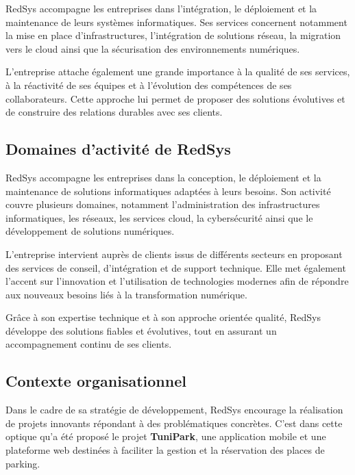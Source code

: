 \par RedSys accompagne les entreprises dans l'intégration, le déploiement et la maintenance de leurs systèmes informatiques. Ses services concernent notamment la mise en place d'infrastructures, l'intégration de solutions réseau, la migration vers le cloud ainsi que la sécurisation des environnements numériques.

\par L'entreprise attache également une grande importance à la qualité de ses services, à la réactivité de ses équipes et à l'évolution des compétences de ses collaborateurs. Cette approche lui permet de proposer des solutions évolutives et de construire des relations durables avec ses clients.


\subsection{Domaines d'activité de RedSys}

\par RedSys accompagne les entreprises dans la conception, le déploiement et la maintenance de solutions informatiques adaptées à leurs besoins. Son activité couvre plusieurs domaines, notamment l'administration des infrastructures informatiques, les réseaux, les services cloud, la cybersécurité ainsi que le développement de solutions numériques.

\par L'entreprise intervient auprès de clients issus de différents secteurs en proposant des services de conseil, d'intégration et de support technique. Elle met également l'accent sur l'innovation et l'utilisation de technologies modernes afin de répondre aux nouveaux besoins liés à la transformation numérique.

\par Grâce à son expertise technique et à son approche orientée qualité, RedSys développe des solutions fiables et évolutives, tout en assurant un accompagnement continu de ses clients.

\subsection{Contexte organisationnel}

\par Dans le cadre de sa stratégie de développement, RedSys encourage la réalisation de projets innovants répondant à des problématiques concrètes. C'est dans cette optique qu'a été proposé le projet \textbf{TuniPark}, une application mobile et une plateforme web destinées à faciliter la gestion et la réservation des places de parking.

